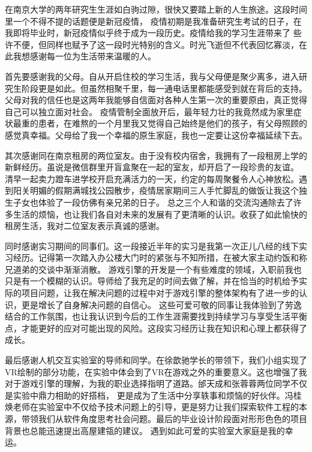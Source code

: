 \begin{acknowledgement}
    
    {
    在南京大学的两年研究生生涯如白驹过隙，很快又要踏上新的人生旅途。这段时间里一个不得不提的话题便是新冠疫情，
    疫情初期是我准备研究生考试的日子，在我即将毕业时，新冠疫情似乎终于成为一段历史。疫情给我的学习生涯带来了
    些许不便，但同样也赋予了这一段时光特别的含义。时光飞逝但不代表回忆寡淡，在此我想感谢每一位为生活带来温暖的人。
    \par
    首先要感谢我的父母。自从开启住校的学习生活，我与父母便是聚少离多，进入研究生阶段更是如此。但虽然相聚千里，每一通电话里都能感受到就在背后的支持。父母对我的信任也是这两年我能够自信面对各种人生第一次的重要原由，真正觉得自己可以独立面对社会。
    疫情管制全面放开后，最年轻力壮的我竟然成为家里症状最重的患者，在难熬的一个月里我又觉得自己始终是他们的孩子，有父母照顾的感觉真幸福。父母给了我一个幸福的原生家庭，我也一定要让这份幸福延续下去。
    \par
    其次感谢同在南京租房的两位室友。由于没有校内宿舍，我拥有了一段租房上学的新鲜经历。虽说是微信群里开盲盒聚在一起的室友，却开启了一段珍贵的友谊。
    清早一起卖力蹬车进学校开启充满活力的一天，约定的每周聚餐令人心神放松。遇到阳关明媚的假期满城找公园散步，疫情居家期间三人手忙脚乱的做饭让我这个独生子女也体验了一段仿佛有亲兄弟的日子。
    总之三个人和谐的交流沟通除去了许多生活的烦恼，也让我们各自对未来的发展有了更清晰的认识。收获了如此愉快的租房生活，我对二位室友表示真诚的感谢。
    \par
    同时感谢实习期间的同事们。这一段接近半年的实习是我第一次正儿八经的线下实习经历。记得第一次踏入办公楼大门时的紧张与不知所措，在被大家主动约饭和称兄道弟的交谈中渐渐消散。
    游戏引擎的开发是一个有些难度的领域，入职前我也只是有一个模糊的认识。导师给了我充足的时间去做了解，并在恰当的时机给予实际的项目问题，让我在解决问题的过程中对于游戏引擎的整体架构有了进一步的认识，更是增长了自身解决问题的自信心。
    这些可爱可敬的同事让我体验到了劳逸结合的工作氛围，也让我认识到今后的工作生涯需要找到持续学习与享受生活平衡点，才能更好的应对可能出现的风险。这段实习经历让我在知识和心理上都获得了成长。
    \par
    最后感谢人机交互实验室的导师和同学。在徐歆驰学长的带领下，我们小组实现了VR绘制的部分功能，在实验中体会到了VR在游戏之外的重要意义。这也增强了我对于游戏引擎的理解，为我的职业选择指明了道路。邰天成和张蓉蓉两位同学不仅是实验中鼎力相助的好搭档，
    更是成为了生活中分享轶事和烦恼的好伙伴。冯桂焕老师在实验室中不仅给予技术问题上的引导，更是努力让我们探索软件工程的本源，带领我们从软件角度思考社会问题。最后的毕业设计阶段面对形形色色的项目背景也总能迅速提出高屋建瓴的建议。
    遇到如此可爱的实验室大家庭是我的幸运。
    }
\end{acknowledgement}